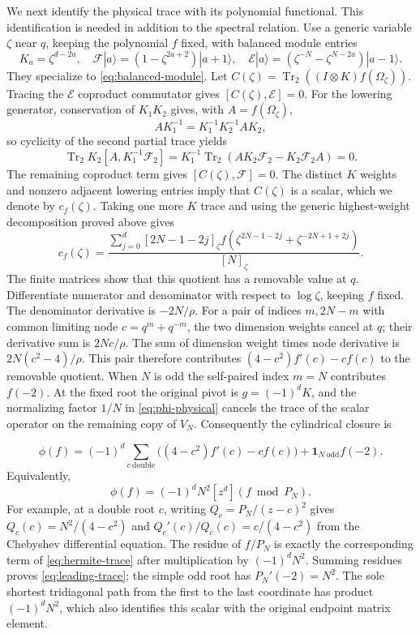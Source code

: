 We next identify the physical trace with its polynomial functional.
This identification is needed in addition to the spectral relation.
Use a generic variable $\zeta$ near $q$, keeping the polynomial $f$
fixed, with balanced module entries
\[
 K_a=\zeta^{d-2a},\quad
 \mathcal F|a\rangle=(1-\zeta^{2a+2})|a+1\rangle,\quad
 \mathcal E|a\rangle=(\zeta^{-N}-\zeta^{N-2a})|a-1\rangle.
\]
They specialize to \eqref{eq:balanced-module}. Let
$C(\zeta)=\operatorname{Tr}_2((I\otimes K)f(\Omega_\zeta))$.
Tracing the $\mathcal E$ coproduct commutator gives
$[C(\zeta),\mathcal E]=0$. For the lowering generator, conservation
of $K_1K_2$ gives, with $A=f(\Omega_\zeta)$,
\[
 A K_1^{-1}=K_1^{-1}K_2^{-1} A K_2,
\]
so cyclicity of the second partial trace yields
\[
 \operatorname{Tr}_2 K_2[A,K_1^{-1}\mathcal F_2]
 =K_1^{-1}\operatorname{Tr}_2
       (A K_2\mathcal F_2-K_2\mathcal F_2 A)=0.
\]
The remaining coproduct term gives $[C(\zeta),\mathcal F]=0$.
The distinct $K$ weights and nonzero adjacent lowering entries imply
that $C(\zeta)$ is a scalar, which we denote by $c_f(\zeta)$.
Taking one more $K$ trace and using the generic highest-weight
decomposition proved above gives
\begin{equation}\label{nt:generic-trace}
 c_f(\zeta)=
 \frac{\displaystyle\sum_{j=0}^{d}[2N-1-2j]_\zeta
 f(\zeta^{2N-1-2j}+\zeta^{-2N+1+2j})}{[N]_\zeta}.
\end{equation}
The finite matrices show that this quotient has a removable value at
$q$. Differentiate numerator and denominator with respect to
$\log\zeta$, keeping $f$ fixed. The denominator derivative is
$-2N/\rho$. For a pair of indices $m,2N-m$ with common limiting
node $c=q^m+q^{-m}$, the two dimension weights cancel at $q$;
their derivative sum is $2Nc/\rho$. The sum of dimension weight
times node derivative is $2N(c^2-4)/\rho$. This pair therefore
contributes $(4-c^2)f'(c)-cf(c)$ to the removable quotient.
When $N$ is odd the self-paired index $m=N$ contributes $f(-2)$.
At the fixed root the original pivot is $g=(-1)^dK$, and the
normalizing factor $1/N$ in \eqref{eq:phi-physical} cancels the
trace of the scalar operator on the remaining copy of $V_N$.
Consequently the cylindrical closure is

\begin{equation}\label{eq:hermite-trace}
 \phi(f)=(-1)^d\sum_{c\ \mathrm{double}}
 \bigl((4-c^2)f'(c)-cf(c)\bigr)
 +\mathbf1_{N\ \mathrm{odd}}f(-2).
\end{equation}
Equivalently,
\begin{equation}\label{eq:leading-trace}
 \phi(f)=(-1)^dN^2[z^d](f\bmod P_N).
\end{equation}
For example, at a double root $c$, writing $Q_c=P_N/(z-c)^2$ gives
$Q_c(c)=N^2/(4-c^2)$ and $Q_c'(c)/Q_c(c)=c/(4-c^2)$ from the Chebyshev differential equation. The residue of $f/P_N$ is exactly the corresponding term of \eqref{eq:hermite-trace} after multiplication by $(-1)^dN^2$. Summing residues proves \eqref{eq:leading-trace}; the simple odd root has $P_N'(-2)=N^2$. The sole shortest tridiagonal path from the first to the last coordinate has product $(-1)^dN^2$, which also identifies this scalar with the original endpoint matrix element.

